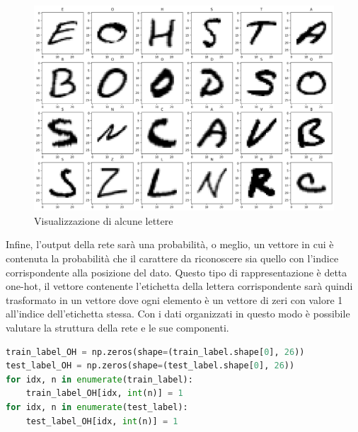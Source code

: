 \documentclass[a4paper,12pt]{article}
\begin{document}
\begin{figure}
    \centering
    \includegraphics[width=1\linewidth]{images/some_letters.png}
    \caption{Visualizzazione di alcune lettere}
    \label{some_letters}
\end{figure}

Infine, l'output della rete sarà una probabilità, o meglio, un vettore in cui è contenuta la probabilità che il carattere da riconoscere sia quello con l'indice corrispondente alla posizione del dato. Questo tipo di rappresentazione è detta one-hot, il vettore contenente l'etichetta della lettera corrispondente sarà quindi trasformato in un vettore dove ogni elemento è un vettore di zeri con valore 1 all'indice dell'etichetta stessa.
Con i dati organizzati in questo modo è possibile valutare la struttura della rete e le sue componenti.

\begin{lstlisting}[float, language=Python, caption={Codice per la rappresentazione one-hot}]
train_label_OH = np.zeros(shape=(train_label.shape[0], 26))
test_label_OH = np.zeros(shape=(test_label.shape[0], 26))
for idx, n in enumerate(train_label):
    train_label_OH[idx, int(n)] = 1
for idx, n in enumerate(test_label):
    test_label_OH[idx, int(n)] = 1
\end{lstlisting}
\end{document}
